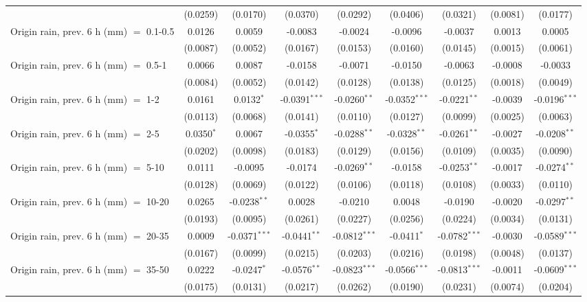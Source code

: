 \begin{tabular}{lcccccccc}
    & (0.0259) & (0.0170) & (0.0370) & (0.0292) & (0.0406) & (0.0321) & (0.0081) & (0.0177)\\
   Origin rain, prev. 6 h (mm) $=$ 0.1-0.5 & 0.0126 & 0.0059 & -0.0083 & -0.0024 & -0.0096 & -0.0037 & 0.0013 & 0.0005\\
    & (0.0087) & (0.0052) & (0.0167) & (0.0153) & (0.0160) & (0.0145) & (0.0015) & (0.0061)\\
   Origin rain, prev. 6 h (mm) $=$ 0.5-1 & 0.0066 & 0.0087 & -0.0158 & -0.0071 & -0.0150 & -0.0063 & -0.0008 & -0.0033\\
    & (0.0084) & (0.0052) & (0.0142) & (0.0128) & (0.0138) & (0.0125) & (0.0018) & (0.0049)\\
   Origin rain, prev. 6 h (mm) $=$ 1-2 & 0.0161 & 0.0132$^{*}$ & -0.0391$^{***}$ & -0.0260$^{**}$ & -0.0352$^{***}$ & -0.0221$^{**}$ & -0.0039 & -0.0196$^{***}$\\
    & (0.0113) & (0.0068) & (0.0141) & (0.0110) & (0.0127) & (0.0099) & (0.0025) & (0.0063)\\
   Origin rain, prev. 6 h (mm) $=$ 2-5 & 0.0350$^{*}$ & 0.0067 & -0.0355$^{*}$ & -0.0288$^{**}$ & -0.0328$^{**}$ & -0.0261$^{**}$ & -0.0027 & -0.0208$^{**}$\\
    & (0.0202) & (0.0098) & (0.0183) & (0.0129) & (0.0156) & (0.0109) & (0.0035) & (0.0090)\\
   Origin rain, prev. 6 h (mm) $=$ 5-10 & 0.0111 & -0.0095 & -0.0174 & -0.0269$^{**}$ & -0.0158 & -0.0253$^{**}$ & -0.0017 & -0.0274$^{**}$\\
    & (0.0128) & (0.0069) & (0.0122) & (0.0106) & (0.0118) & (0.0108) & (0.0033) & (0.0110)\\
   Origin rain, prev. 6 h (mm) $=$ 10-20 & 0.0265 & -0.0238$^{**}$ & 0.0028 & -0.0210 & 0.0048 & -0.0190 & -0.0020 & -0.0297$^{**}$\\
    & (0.0193) & (0.0095) & (0.0261) & (0.0227) & (0.0256) & (0.0224) & (0.0034) & (0.0131)\\
   Origin rain, prev. 6 h (mm) $=$ 20-35 & 0.0009 & -0.0371$^{***}$ & -0.0441$^{**}$ & -0.0812$^{***}$ & -0.0411$^{*}$ & -0.0782$^{***}$ & -0.0030 & -0.0589$^{***}$\\
    & (0.0167) & (0.0099) & (0.0215) & (0.0203) & (0.0216) & (0.0198) & (0.0048) & (0.0137)\\
   Origin rain, prev. 6 h (mm) $=$ 35-50 & 0.0222 & -0.0247$^{*}$ & -0.0576$^{**}$ & -0.0823$^{***}$ & -0.0566$^{***}$ & -0.0813$^{***}$ & -0.0011 & -0.0609$^{***}$\\
    & (0.0175) & (0.0131) & (0.0217) & (0.0262) & (0.0190) & (0.0231) & (0.0074) & (0.0204)\\

\end{tabular}
